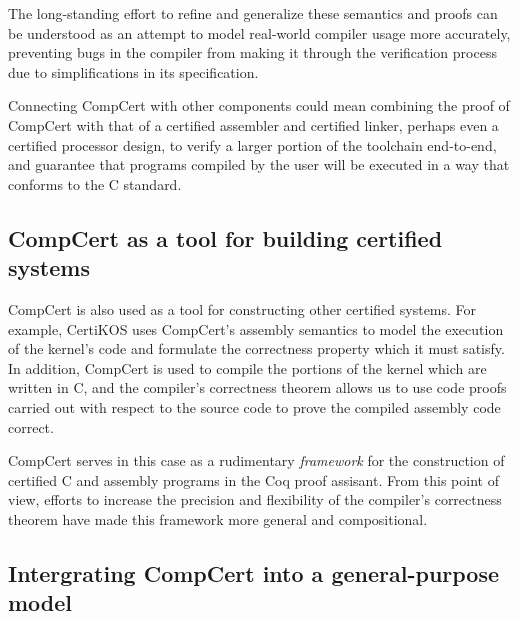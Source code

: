 \documentclass[11pt,oneside,draft]{book}
\theoremstyle{definition}
\begin{document}
The long-standing effort to refine and generalize
these semantics and proofs
can be understood as
an attempt to model real-world compiler usage
more accurately,
preventing bugs in the compiler
from making it through the verification process
due to simplifications in its specification.

Connecting CompCert with other components
could mean combining the proof of CompCert
with that of a certified assembler
and certified linker,
perhaps even a certified processor design,
to verify a larger portion of the toolchain end-to-end,
and guarantee that programs compiled by the user
will be executed in a way that conforms to
the C standard.

\subsection{CompCert as a tool for building certified systems}

CompCert is also used as a tool
for constructing other certified systems.
For example,
CertiKOS uses CompCert's assembly semantics
to model the execution of the kernel's code
and formulate the correctness property
which it must satisfy.
In addition,
CompCert is used to compile the portions of the kernel
which are written in C,
and the compiler's correctness theorem
allows us to use code proofs carried out
with respect to the source code
to prove the compiled assembly code correct.

CompCert serves in this case as
a rudimentary \emph{framework} for the construction of
certified C and assembly programs
in the Coq proof assisant.
From this point of view,
efforts to increase the precision and flexibility
of the compiler's correctness theorem
have made this framework more general and compositional.

\subsection{Intergrating CompCert into a general-purpose model}
\end{document}
